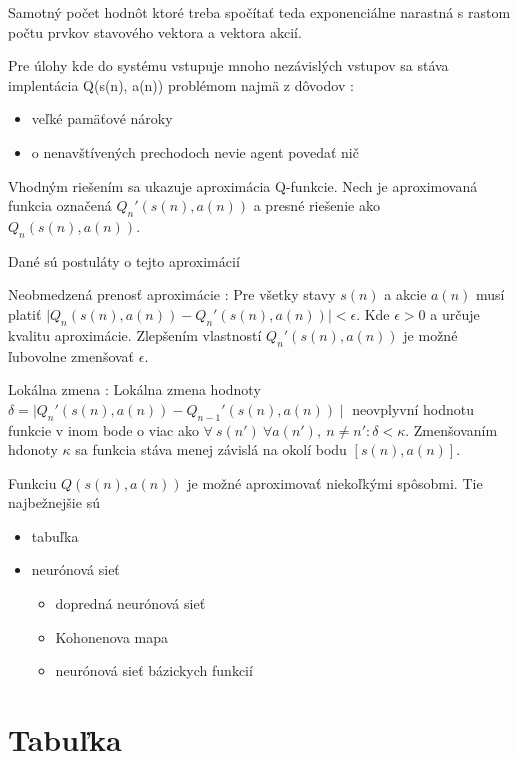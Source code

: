 Samotný počet hodnôt ktoré treba spočítať teda exponenciálne narastná s rastom
počtu prvkov stavového vektora a vektora akcií.

Pre úlohy kde do systému vstupuje mnoho nezávislých vstupov sa stáva implentácia Q(s(n), a(n))
problémom najmä z dôvodov :

\begin{itemize}
\item veľké pamäťové nároky
\item o nenavštívených prechodoch nevie agent povedať nič
\end{itemize}

Vhodným riešením sa ukazuje aproximácia Q-funkcie.
Nech je aproximovaná funkcia označená $Q_n'(s(n), a(n))$ a presné riešenie ako $Q_n(s(n), a(n))$.

Dané sú postuláty o tejto aproximácií
\begin{theorem}{Neobmedzená prenosť aproximácie : }
\label{post:01}
Pre všetky stavy $s(n)$ a akcie $a(n)$ musí platiť
$\mid Q_n(s(n), a(n)) - Q_n'(s(n), a(n)) \mid < \epsilon $. Kde $\epsilon > 0$ a
určuje kvalitu aproximácie. Zlepšením vlastností $Q_n'(s(n), a(n))$ je možné
ľubovolne zmenšovať  $\epsilon$.
\end{theorem}

\begin{theorem}{Lokálna zmena : }
\label{post:02}
Lokálna zmena hodnoty $\delta = \mid Q_n'(s(n), a(n)) - Q_{n-1}'(s(n), a(n)) \mid$ neovplyvní hodnotu funkcie v
inom bode o viac ako $\forall \ s(n') \ \forall a(n'),\ n \neq n' : \delta < \kappa$.
Zmenšovaním hdonoty $\kappa$ sa funkcia stáva menej závislá na okolí bodu $[s(n), a(n)]$.
\end{theorem}

Funkciu $Q(s(n), a(n))$ je možné aproximovať niekoľkými spôsobmi.
Tie najbežnejšie sú

\begin{itemize}
\item tabuľka
\item neurónová sieť
  \begin{itemize}
    \item dopredná neurónová sieť
    \item Kohonenova mapa
    \item neurónová sieť bázickych funkcií
  \end{itemize}
\end{itemize}

\section{Tabuľka}


